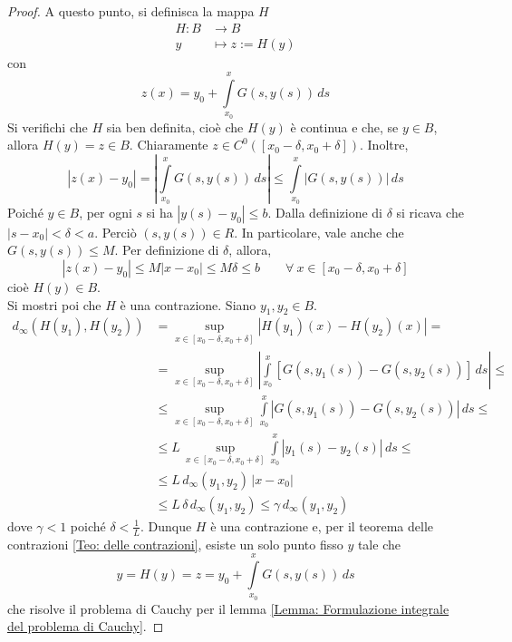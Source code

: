 \begin{proof}
A questo punto, si definisca la mappa $H$
\begin{equation}
    \begin{aligned}
        H: B &\to B\\
        y &\mapsto z:=H(y)
    \end{aligned}
\end{equation}
con
\begin{equation}
    z(x)=y_0+ \int\limits_{x_0}^{x}{G(s, y(s))}\,ds
\end{equation}
Si verifichi che $H$ sia ben definita, cioè che $H(y)$ è continua e che, se $y \in B$, allora $H(y)=z \in B$. Chiaramente $z \in C^0([x_0-\delta, x_0+\delta])$. Inoltre,
\begin{equation}
    |z(x)-y_0|=\left|\int\limits_{x_0}^{x}{G(s, y(s))}\,ds\right| \leq
\int\limits_{x_0}^{x}\left|{G(s, y(s))}\right|\,ds
\end{equation}
Poiché $y \in B$, per ogni $s$ si ha $|y(s)-y_0|\leq b$. Dalla definizione di $\delta$ si ricava che $|s-x_0|<\delta<a$. Perciò $(s, y(s)) \in R$. In particolare, vale anche che $G(s, y(s)) \leq M$. Per definizione di $\delta$, allora,
\begin{equation}
    |z(x)-y_0|\leq M|x-x_0|\leq M\delta \leq b \qquad \forall\ x \in [x_0-\delta, x_0+\delta]
\end{equation}
cioè $H(y) \in B$.\\
Si mostri poi che $H$ è una contrazione. Siano $y_1, y_2 \in B$.
\begin{equation}
\begin{aligned}
    d_\infty(H(y_1), H(y_2))&= \sup_{x \in [x_0-\delta, x_0+\delta]}{|H(y_1)(x)-H(y_2)(x)|}=\\
    &=\sup_{x \in [x_0-\delta, x_0+\delta]}\left|{\int\limits_{x_0}^{x}{\left[G(s,y_1(s))-G(s, y_2(s))\right]}}\,ds\right| \leq \\
    &\leq \sup_{x \in [x_0-\delta, x_0+\delta]}{\int\limits_{x_0}^{x}{\left|G(s,y_1(s))-G(s, y_2(s))\right|}}\,ds \leq\\
    &\leq L\,  \sup_{x \in [x_0-\delta, x_0+\delta]}{\int\limits_{x_0}^{x}{\left|y_1(s)-y_2(s)\right|}}\,ds\leq\\
    &\leq L \,d_\infty(y_1, y_2)\, |x-x_0| \\
    &\leq L\, \delta\, d_\infty(y_1, y_2) \leq \gamma\, d_\infty(y_1,y_2)
\end{aligned}
\end{equation}
dove $\gamma<1$ poiché $\delta<\tfrac{1}{L}$. Dunque $H$ è una contrazione e, per il teorema delle contrazioni \eqref{Teo: delle contrazioni}, esiste un solo punto fisso $y$ tale che
\begin{equation}
    y=H(y)=z= y_0+ \int\limits_{x_0}^{x}{G(s, y(s))}\,ds
\end{equation}
che risolve il problema di Cauchy per il lemma \ref{Lemma: Formulazione integrale del problema di Cauchy}.
\end{proof}
